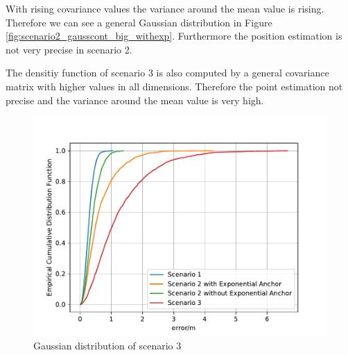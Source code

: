 \documentclass{article}
\begin{document}
\begin{itemize}
		With rising covariance values the variance around the mean value is rising. Therefore we can see a general Gaussian distribution in Figure \ref{fig:scenario2_gausscont_big_withexp}. Furthermore the position estimation is not very precise in scenario 2.
		
	    \begin{figure}[hbt!]
        \begin{floatrow}
		\end{floatrow}
		\end{figure}
	
        The densitiy function of scenario 3 is also computed by a general covariance matrix with higher values in all dimensions. Therefore the point estimation not precise and the variance around the mean value is very high.
        
        \newpage
        
        \begin{figure}[hbt!]
            \centering
            \includegraphics[width=\textwidth]{./Figures/All_ecdf_ls.pdf}
            \caption{Gaussian distribution of scenario 3}
            \label{fig:All_ecdf_ls}
        \end{figure}
        

\end{itemize}
\end{document}
